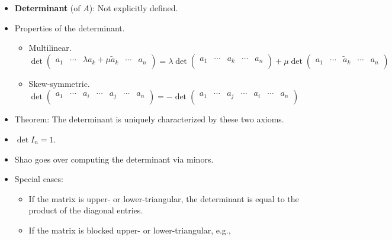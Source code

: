 \documentclass[../notes.tex]{subfiles}
\begin{document}
\begin{itemize}
    \item \textbf{Determinant} (of $A$): Not explicitly defined.
    \item Properties of the determinant.
    \begin{itemize}
        \item Multilinear.
        \begin{equation*}
            \det
            \begin{pmatrix}
                a_1 & \cdots & \lambda a_k+\mu\tilde{a}_k & \cdots & a_n\\
            \end{pmatrix}
            = \lambda\det
            \begin{pmatrix}
                a_1 & \cdots & a_k & \cdots & a_n\\
            \end{pmatrix}
            +\mu\det
            \begin{pmatrix}
                a_1 & \cdots & \tilde{a}_k & \cdots & a_n\\
            \end{pmatrix}
        \end{equation*}
        \item Skew-symmetric.
        \begin{equation*}
            \det
            \begin{pmatrix}
                a_1 & \cdots & a_i & \cdots & a_j & \cdots & a_n\\
            \end{pmatrix}
            = -\det
            \begin{pmatrix}
                a_1 & \cdots & a_j & \cdots & a_i & \cdots & a_n\\
            \end{pmatrix}
        \end{equation*}
    \end{itemize}
    \item Theorem: The determinant is uniquely characterized by these two axioms.
    \item $\det I_n=1$.
    \item Shao goes over computing the determinant via minors.
    \item Special cases:
    \begin{itemize}
        \item If the matrix is upper- or lower-triangular, the determinant is equal to the product of the diagonal entries.
        \item If the matrix is blocked upper- or lower-triangular, e.g.,

\end{itemize}
\end{itemize}
\end{document}
